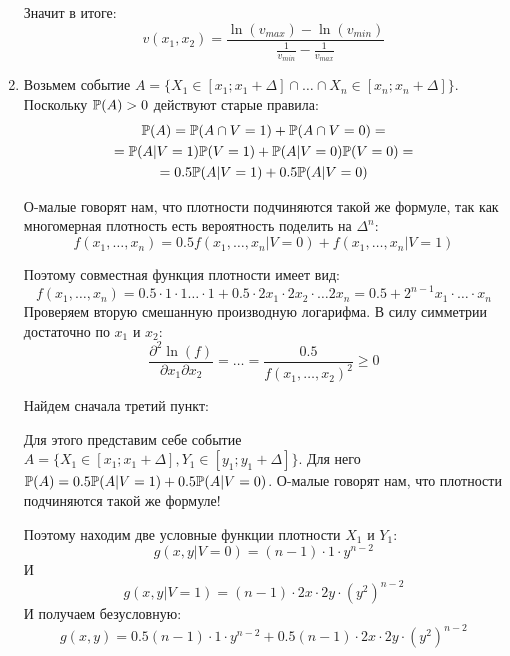 \begin{enumerate}
Значит в итоге:
\begin{equation}
v(x_{1},x_{2})=\frac{\ln(v_{max})-\ln(v_{min})}{\frac{1}{v_{min}}-\frac{1}{v_{max}}}
\end{equation}

\item Возьмем событие $ A=\{X_{1}\in[x_{1};x_{1}+\Delta] \cap \ldots \cap X_{n}\in[x_{n};x_{n}+\Delta]\} $. Поскольку $ \P(A)>0 $ действуют старые правила:
\begin{multline}
\P(A)=\P(A\cap V=1)+\P(A\cap V=0)=\\
=\P(A|V=1)\P(V=1)+\P(A|V=0)\P(V=0)=\\
=0.5\P(A|V=1)+0.5\P(A|V=0)
\end{multline}

О-малые говорят нам, что плотности подчиняются такой же формуле, так как многомерная плотность есть вероятность поделить на $ \Delta^{n} $:
\begin{equation}
f(x_{1},\ldots,x_{n})=0.5f(x_{1},\ldots,x_{n}|V=0)+f(x_{1},\ldots,x_{n}|V=1)
\end{equation}

Поэтому совместная функция плотности имеет вид:
\begin{equation}
f(x_{1},\ldots,x_{n})=0.5\cdot 1\cdot 1 \ldots\cdot 1+0.5\cdot 2x_{1}\cdot 2x_{2}\cdot \ldots 2x_{n}=0.5+2^{n-1}x_{1}\cdot \ldots \cdot x_{n}
\end{equation}
Проверяем вторую смешанную производную логарифма. В силу симметрии достаточно по $ x_{1} $ и $ x_{2} $:
\begin{equation}
\frac{\partial^{2}\ln(f)}{\partial x_{1}\partial x_{2}}=\ldots=\frac{0.5}{f(x_{1},\ldots,x_{2})^{2}}\geq 0
\end{equation}


Найдем сначала третий пункт:

Для этого представим себе событие $ A=\{X_{1}\in [x_{1};x_{1}+\Delta], Y_{1}\in[y_{1};y_{1}+\Delta]\} $. Для него $ \P(A)= 0.5\P(A|V=1)+0.5\P(A|V=0)$. О-малые говорят нам, что плотности подчиняются такой же формуле!

Поэтому находим две условные функции плотности $ X_{1} $ и $ Y_{1} $:
\begin{equation}
g(x,y|V=0)=(n-1)\cdot 1 \cdot y^{n-2}
\end{equation}
И
\begin{equation}
g(x,y|V=1)=(n-1)\cdot 2x \cdot 2y \cdot (y^{2})^{n-2}
\end{equation}
И получаем безусловную:
\begin{equation}
g(x,y)=0.5(n-1)\cdot 1 \cdot y^{n-2}+0.5(n-1)\cdot 2x \cdot 2y \cdot (y^{2})^{n-2}
\end{equation}


\end{enumerate}
